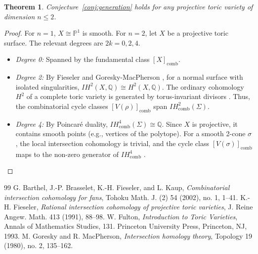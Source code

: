 \documentclass[10pt,a4paper]{amsart}
\newtheorem{theorem}{Theorem}
\newcommand{\IHcomb}{IH_{\mathrm{comb}}}
\newcommand{\IP}{\mathbb{P}}
\newcommand{\IQ}{\mathbb{Q}}
\begin{document}
	\begin{theorem}
		Conjecture~\ref{conj:generation} holds for any projective toric variety of dimension $n \le 2$.
	\end{theorem}

	\begin{proof}
		For $n=1$, $X \cong \IP^1$ is smooth. For $n=2$, let $X$ be a projective toric surface. The relevant degrees are $2k = 0, 2, 4$.
		\begin{itemize}
			\item \emph{Degree 0:} Spanned by the fundamental class $[X]_{\mathrm{comb}}$.
			\item \emph{Degree 2:} By Fieseler \cite[Thm.~1.1]{Fieseler91} and Goresky-MacPherson \cite[6.2]{GM80}, for a normal surface with isolated singularities, $IH^2(X, \IQ) \cong H^2(X, \IQ)$. The ordinary cohomology $H^2$ of a complete toric variety is generated by torus-invariant divisors \cite[Section 3.4]{Fulton}. Thus, the combinatorial cycle classes $[V(\rho)]_{\mathrm{comb}}$ span $\IHcomb^2(\Sigma)$.
			\item \emph{Degree 4:} By Poincar\'e duality, $\IHcomb^4(\Sigma) \cong \IQ$. Since $X$ is projective, it contains smooth points (e.g., vertices of the polytope). For a smooth 2-cone $\sigma$, the local intersection cohomology is trivial, and the cycle class $[V(\sigma)]_{\mathrm{comb}}$ maps to the non-zero generator of $\IHcomb^4$ \cite{BBFK}.
		\end{itemize}
	\end{proof}

\begin{thebibliography}{99}
 G. Barthel, J.-P. Brasselet, K.-H. Fieseler, and L. Kaup, \textit{Combinatorial intersection cohomology for fans}, Tohoku Math. J. (2) 54 (2002), no. 1, 1--41.
 K.-H. Fieseler, \textit{Rational intersection cohomology of projective toric varieties}, J. Reine Angew. Math. 413 (1991), 88--98.
 W. Fulton, \textit{Introduction to Toric Varieties}, Annals of Mathematics Studies, 131. Princeton University Press, Princeton, NJ, 1993.
 M. Goresky and R. MacPherson, \textit{Intersection homology theory}, Topology 19 (1980), no. 2, 135--162.
\end{thebibliography}
\end{document}
